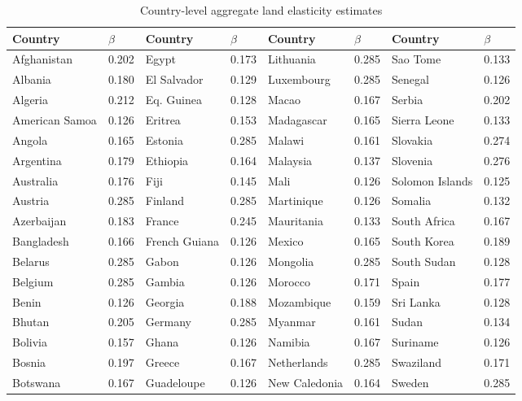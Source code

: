 \documentclass[12pt]{article}
\begin{document}
\clearpage
\begin{table}[!htb]
\begin{center}
\caption{Country-level aggregate land elasticity estimates}
\label{TAB_beta_country}
{\footnotesize
\begin{tabularx}{\textwidth}{lXlXlXlX}
\midrule
Country & $\beta$ & Country & $\beta$ & Country & $\beta$ & Country & $\beta$ \\
\midrule
Afghanistan &     0.202 & Egypt &     0.173 & Lithuania &     0.285 & Sao Tome &     0.133 \\
Albania &     0.180 & El Salvador &     0.129 & Luxembourg &     0.285 & Senegal &     0.126 \\
Algeria &     0.212 & Eq. Guinea &     0.128 & Macao &     0.167 & Serbia &     0.202 \\
American Samoa &     0.126 & Eritrea &     0.153 & Madagascar &     0.165 & Sierra Leone &     0.133 \\
Angola &     0.165 & Estonia &     0.285 & Malawi &     0.161 & Slovakia &     0.274 \\
Argentina &     0.179 & Ethiopia &     0.164 & Malaysia &     0.137 & Slovenia &     0.276 \\
Australia &     0.176 & Fiji &     0.145 & Mali &     0.126 & Solomon Islands &     0.125 \\
Austria &     0.285 & Finland &     0.285 & Martinique &     0.126 & Somalia &     0.132 \\
Azerbaijan &     0.183 & France &     0.245 & Mauritania &     0.133 & South Africa &     0.167 \\
Bangladesh &     0.166 & French Guiana &     0.126 & Mexico &     0.165 & South Korea &     0.189 \\
Belarus &     0.285 & Gabon &     0.126 & Mongolia &     0.285 & South Sudan &     0.128 \\
Belgium &     0.285 & Gambia &     0.126 & Morocco &     0.171 & Spain &     0.177 \\
Benin &     0.126 & Georgia &     0.188 & Mozambique &     0.159 & Sri Lanka &     0.128 \\
Bhutan &     0.205 & Germany &     0.285 & Myanmar &     0.161 & Sudan &     0.134 \\
Bolivia &     0.157 & Ghana &     0.126 & Namibia &     0.167 & Suriname &     0.126 \\
Bosnia &     0.197 & Greece &     0.167 & Netherlands &     0.285 & Swaziland &     0.171 \\
Botswana &     0.167 & Guadeloupe &     0.126 & New Caledonia &     0.164 & Sweden &     0.285 \\

\end{tabularx}}
\end{center}
\end{table}
\end{document}
